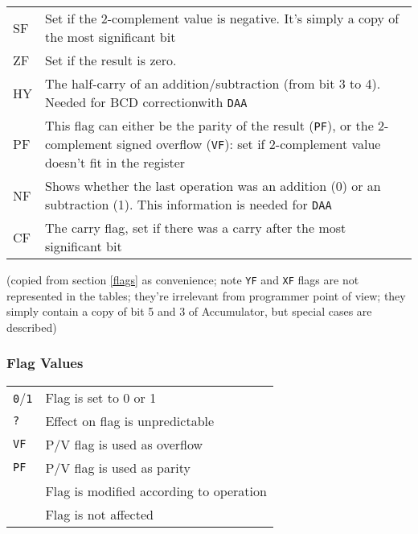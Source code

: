 \documentclass[twoside,openright,a4paper]{book}
\newcommand{\notet}{\rule{0pt}{2.4ex}}
\begin{document}
\begin{tabular}{lp{13cm}}
	SF & 
		Set if the 2-complement value is negative.  It’s simply a copy of the most significant bit \\
	ZF\notet & 
		Set if the result is zero. \\
	HY\notet & 
		The half-carry of an addition/subtraction (from bit 3 to 4). Needed for BCD correctionwith {\tt DAA} \\
	PF\notet & 
		This flag can either be the parity of the result ({\tt PF}), or the 2-complement signed overflow ({\tt VF}): set if 2-complement value doesn’t fit in the register \\
	NF\notet & 
		Shows whether the last operation was an addition (0) or an subtraction  (1). This information is needed for {\tt DAA} \\
	CF\notet & 
		The carry flag, set if there was a carry after the most significant bit \\
\end{tabular}

(copied from section \ref{flags} as convenience; note {\tt YF} and {\tt XF} flags are not represented in the tables; they're irrelevant from programmer point of view; they simply contain a copy of bit 5 and 3 of Accumulator, but special cases are described)

\subsubsection{Flag Values}

\begin{tabular}{ll}
	{\tt 0}/{\tt 1} & Flag is set to 0 or 1 \\
	{\tt ?} & Effect on flag is unpredictable \\
	{\tt VF} & P/V flag is used as overflow \\
	{\tt PF} & P/V flag is used as parity \\
	{\tt \FS} & Flag is modified according to operation \\
	{\tt \FN} & Flag is not affected \\
\end{tabular}


\pagebreak

%
%
\end{document}
